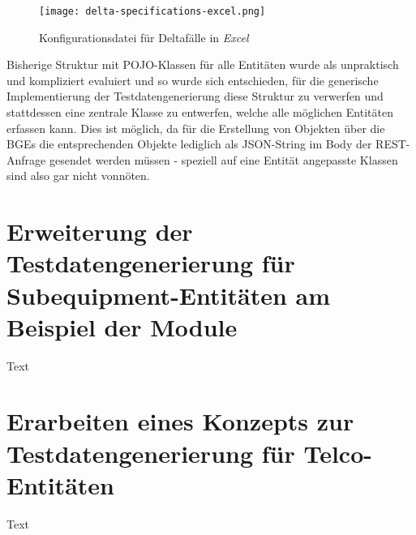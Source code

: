 \begin{figure}[h]
    \centering
    \texttt{[image: delta-specifications-excel.png]}
    \caption{Konfigurationsdatei für Deltafälle in \textit{Excel}\footnotemark}
\end{figure}

Bisherige Struktur mit POJO-Klassen für alle Entitäten wurde als unpraktisch und kompliziert evaluiert und so wurde sich entschieden, für die generische Implementierung der Testdatengenerierung diese Struktur zu verwerfen und stattdessen eine zentrale Klasse zu entwerfen, welche alle möglichen Entitäten erfassen kann. Dies ist möglich, da für die Erstellung von Objekten über die BGEs die entsprechenden Objekte lediglich als \ac{JSON}-String im Body der REST-Anfrage gesendet werden müssen - speziell auf eine Entität angepasste Klassen sind also gar nicht vonnöten.

\section{Erweiterung der Testdatengenerierung für Subequipment-Entitäten am Beispiel der Module}\label{sec:tdgmodule}
Text

\section{Erarbeiten eines Konzepts zur Testdatengenerierung für Telco-Entitäten}\label{sec:tdgtelco}
Text